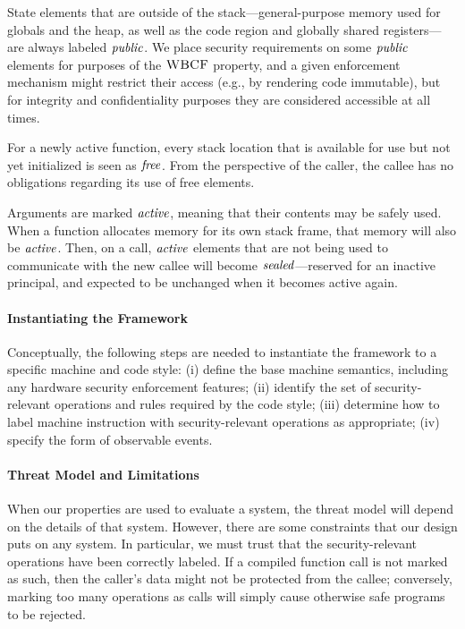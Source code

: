 \documentclass[10pt,conference]{ieeetran}%
\theoremstyle{definition}
\begin{document}
State elements that are outside of the stack---general-purpose memory used for
globals and the heap, as well as the code region and globally shared
registers---are always labeled \(\mathit{public}\). We place security requirements on some
\(\mathit{public}\) elements for purposes of the \(\textnormal{\sc WBCF}\) property, and a
given enforcement mechanism
might restrict their access (e.g., by rendering code immutable), but for integrity
and confidentiality purposes they are considered accessible at all times.

For a newly active function, every stack location that is available
for use but not yet initialized
is seen as \(\mathit{free}\). From the perspective of the caller, the callee has no obligations
regarding its use of free elements.

Arguments are marked \(\mathit{active}\), meaning that their contents may be safely used.
When a function allocates memory for its own stack frame, that memory will also be \(\mathit{active}\).
Then, on a call, \(\mathit{active}\) elements that are not being used to communicate with
the new callee will become \(\mathit{sealed}\)---reserved for an inactive principal,
and expected to be unchanged when it becomes active again.

\paragraph*{Instantiating the Framework}

Conceptually, the following steps are needed to instantiate the framework to a specific machine
and code style: (i) define the base machine semantics, including any hardware
security enforcement features; (ii) identify the set of
security-relevant operations and rules required by the code style; (iii) determine
how to label machine instruction with security-relevant
operations as appropriate; (iv) specify the form of observable events.

\paragraph*{Threat Model and Limitations}

When our properties are used to evaluate a system, the threat model
will depend on the details of that system. However, there are some
constraints that our design puts on any system. In particular, we must
trust that the security-relevant operations have been correctly labeled.
If a compiled function
call is not marked as such, then the caller's data might not be
protected from the callee; conversely, marking too many operations as
calls will simply cause otherwise safe programs to be rejected.
\end{document}
